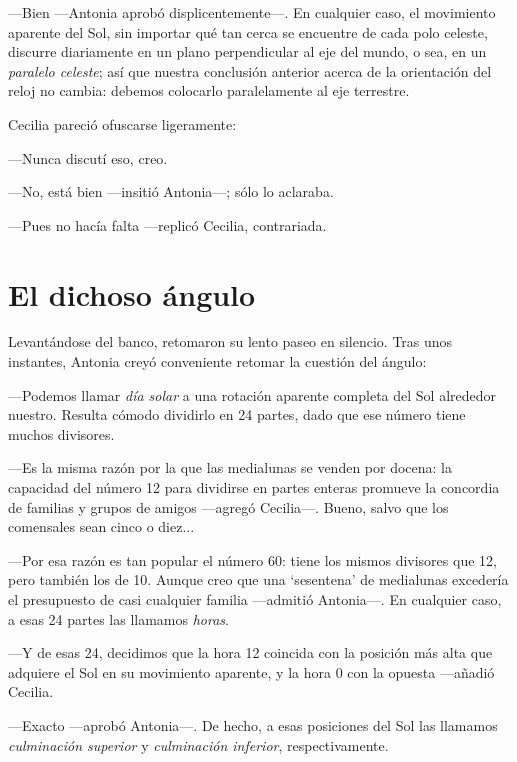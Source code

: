 ---Bien ---Antonia aprobó displicentemente---. En cualquier caso, el
movimiento aparente del Sol, sin importar qué tan cerca se encuentre
de cada polo celeste, discurre diariamente en un plano perpendicular
al eje del mundo, o sea, en un \emph{paralelo celeste}; así que
nuestra conclusión anterior acerca de la orientación del reloj no
cambia: debemos colocarlo paralelamente al eje terrestre.

Cecilia pareció ofuscarse ligeramente:

---Nunca discutí eso, creo.

---No, está bien ---insitió Antonia---; sólo lo aclaraba.

---Pues no hacía falta ---replicó Cecilia, contrariada.

\section{El dichoso ángulo}


Levantándose del banco, retomaron su lento paseo en silencio. Tras
unos instantes, Antonia creyó conveniente retomar la cuestión del
ángulo:

---Podemos llamar \emph{día solar} a una rotación aparente completa
del Sol alrededor nuestro. Resulta cómodo dividirlo en 24 partes, dado
que ese número tiene muchos divisores.

---Es la misma razón por la que las medialunas se venden por docena:
la capacidad del número 12 para dividirse en partes enteras promueve
la concordia de familias y grupos de amigos ---agregó
Cecilia---. Bueno, salvo que los comensales sean cinco o diez...

---Por esa razón es tan popular el número 60: tiene los mismos
divisores que 12, pero también los de 10. Aunque creo que una
`sesentena' de medialunas excedería el presupuesto de casi cualquier
familia ---admitió Antonia---. En cualquier caso, a esas 24 partes las
llamamos \emph{horas}.

---Y de esas 24, decidimos que la hora 12 coincida con la posición más
alta que adquiere el Sol en su movimiento aparente, y la hora 0 con la
opuesta ---añadió Cecilia.

---Exacto ---aprobó Antonia---. De hecho, a esas posiciones del Sol
las llamamos \emph{culminación superior} y \emph{culminación
  inferior}, respectivamente.


